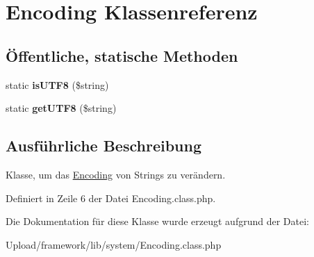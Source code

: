 \hypertarget{class_encoding}{}\section{Encoding Klassenreferenz}
\label{class_encoding}
\subsection*{Öffentliche, statische Methoden}
\begin{DoxyCompactItemize}
\item 
\mbox{\label{class_encoding_a94ef1b7df448c661c92a97163b67390a}} 
static {\bfseries is\+U\+T\+F8} (\$string)
\item 
\mbox{\label{class_encoding_aff606485616ec1ddf0a76a8fcb77e73a}} 
static {\bfseries get\+U\+T\+F8} (\$string)
\end{DoxyCompactItemize}


\subsection{Ausführliche Beschreibung}
Klasse, um das \mbox{\hyperlink{class_encoding}{Encoding}} von Strings zu verändern. 

Definiert in Zeile 6 der Datei Encoding.\+class.\+php.



Die Dokumentation für diese Klasse wurde erzeugt aufgrund der Datei\+:\begin{DoxyCompactItemize}
\item 
Upload/framework/lib/system/Encoding.\+class.\+php\end{DoxyCompactItemize}

